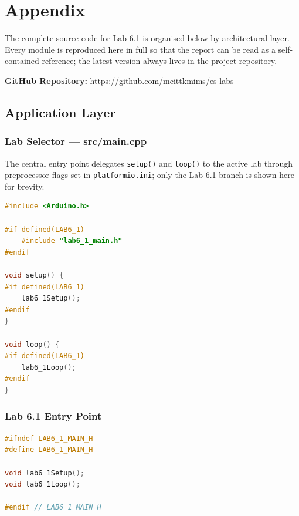 \section{Appendix}

The complete source code for Lab 6.1 is organised below by architectural layer. Every module is reproduced here in full so that the report can be read as a self-contained reference; the latest version always lives in the project repository.

\textbf{GitHub Repository:} \url{https://github.com/mcittkmims/es-labs}

\subsection{Application Layer}

\subsubsection{Lab Selector --- src/main.cpp}

The central entry point delegates \texttt{setup()} and \texttt{loop()} to the active lab through preprocessor flags set in \texttt{platformio.ini}; only the Lab 6.1 branch is shown here for brevity.

\begin{lstlisting}[language=C++, caption=src/main.cpp --- Lab selector (excerpt for Lab 6.1), label=lst:appendix_main]
#include <Arduino.h>

#if defined(LAB6_1)
    #include "lab6_1_main.h"
#endif

void setup() {
#if defined(LAB6_1)
    lab6_1Setup();
#endif
}

void loop() {
#if defined(LAB6_1)
    lab6_1Loop();
#endif
}
\end{lstlisting}

\subsubsection{Lab 6.1 Entry Point}

\begin{lstlisting}[language=C++, caption=lab/lab6\_1/lab6\_1\_main.h --- public interface, label=lst:appendix_lab6_1_h]
#ifndef LAB6_1_MAIN_H
#define LAB6_1_MAIN_H

void lab6_1Setup();
void lab6_1Loop();

#endif // LAB6_1_MAIN_H
\end{lstlisting}

